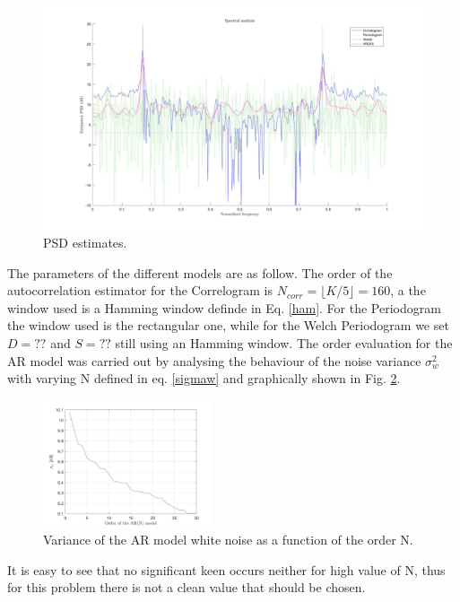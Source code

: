 \documentclass[a4paper,11pt,openright,twoside]{report}
\begin{document}
\begin{figure}
	\centering
	\includegraphics[width=15cm]{images/PSD.jpg}
	\caption{PSD estimates.}\label{PSD} 
\end{figure}

The parameters of the different models are as follow. The order of the autocorrelation estimator for the Correlogram is $ N_{corr} = \lfloor K/5 \rfloor = 160 $, a the window used is a Hamming window definde in Eq. \ref{ham}. For the Periodogram the window used is the rectangular one, while for the Welch Periodogram we set $D=??$ and $S=??$ still using an Hamming window. The order evaluation for the AR model was carried out by analysing the behaviour of the noise variance $\sigma_w^2$ with varying N defined in eq. \ref{sigmaw} and graphically shown in Fig. \ref{sigmavsN}.

\begin{figure}[h]
	\centering
	\includegraphics[width=5cm]{images/sigma_vs_N.jpg}
	\caption{Variance of the AR model white noise as a function of the order N.}\label{sigmavsN}
\end{figure}

It is easy to see that no significant keen occurs neither for high value of N, thus for this problem there is not a clean value that should be chosen.









	
	
\end{document}
